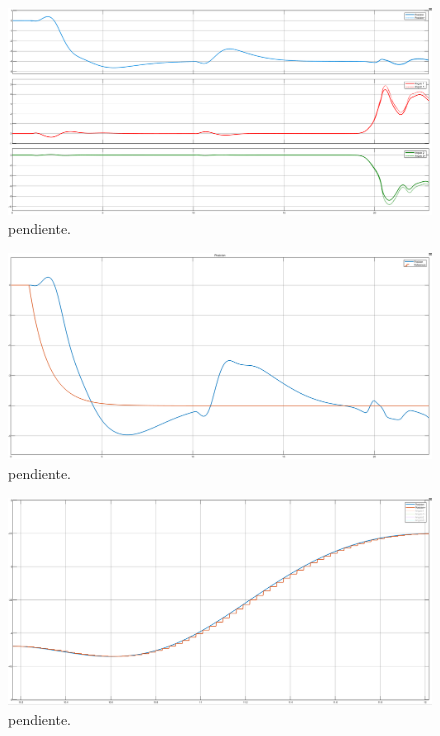 \begin{figure}[H]
	\centering
	\includegraphics[width=\linewidth]{../Analisis de Resultados/ImagenesAnalisis de Resultados/obsv_vars.png}
	\caption{pendiente.}	
	\label{fig:obsv_vars}
\end{figure}


\begin{figure}[H]
	\centering
	\includegraphics[width=\linewidth]{../Analisis de Resultados/ImagenesAnalisis de Resultados/obsv_disc_posref.png}
	\caption{pendiente.}	
	\label{fig:obsv_disc_posref}
\end{figure}

\begin{figure}[H]
	\centering
	\includegraphics[width=\linewidth]{../Analisis de Resultados/ImagenesAnalisis de Resultados/obsv_disc_posdisc.png}
	\caption{pendiente.}	
	\label{fig:obsv_disc_posdisc}
\end{figure}

